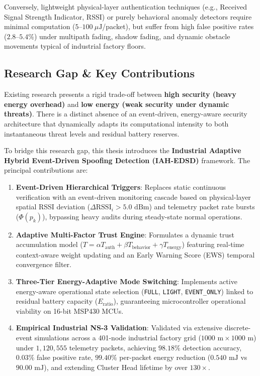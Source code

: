 \documentclass[11pt,a4paper,oneside]{book}
\begin{document}
Conversely, lightweight physical-layer authentication techniques (e.g., Received Signal Strength Indicator, RSSI) or purely behavioral anomaly detectors require minimal computation ($5\text{--}100\ \mu\text{J}$/packet), but suffer from high false positive rates ($2.8\text{--}5.4\%$) under multipath fading, shadow fading, and dynamic obstacle movements typical of industrial factory floors.

\subsection{Research Gap \& Key Contributions}
Existing research presents a rigid trade-off between \textbf{high security (heavy energy overhead)} and \textbf{low energy (weak security under dynamic threats)}. There is a distinct absence of an event-driven, energy-aware security architecture that dynamically adapts its computational intensity to both instantaneous threat levels and residual battery reserves.

To bridge this research gap, this thesis introduces the \textbf{Industrial Adaptive Hybrid Event-Driven Spoofing Detection (IAH-EDSD)} framework. The principal contributions are:
\begin{enumerate}
    \item \textbf{Event-Driven Hierarchical Triggers}: Replaces static continuous verification with an event-driven monitoring cascade based on physical-layer spatial RSSI deviation ($\Delta\text{RSSI}_i > 5.0\text{ dBm}$) and telemetry packet rate bursts ($\Phi(p_k)$), bypassing heavy audits during steady-state normal operations.
    \item \textbf{Adaptive Multi-Factor Trust Engine}: Formulates a dynamic trust accumulation model ($T = \alpha T_{\text{auth}} + \beta T_{\text{behavior}} + \gamma T_{\text{energy}}$) featuring real-time context-aware weight updating and an Early Warning Score (EWS) temporal convergence filter.
    \item \textbf{Three-Tier Energy-Adaptive Mode Switching}: Implements active energy-aware operational state selection (\texttt{FULL}, \texttt{LIGHT}, \texttt{EVENT\_ONLY}) linked to residual battery capacity ($E_{\text{ratio}}$), guaranteeing microcontroller operational viability on 16-bit MSP430 MCUs.
    \item \textbf{Empirical Industrial NS-3 Validation}: Validated via extensive discrete-event simulations across a 401-node industrial factory grid ($1000\text{ m} \times 1000\text{ m}$) under $1,120,555$ telemetry packets, achieving $98.18\%$ detection accuracy, $0.03\%$ false positive rate, $99.40\%$ per-packet energy reduction ($0.540\text{ mJ}$ vs $90.00\text{ mJ}$), and extending Cluster Head lifetime by over $130\times$.
\end{enumerate}
\end{document}
